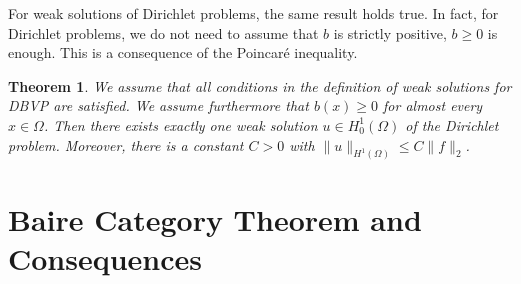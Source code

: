 \documentclass[11pt,a4paper]{article}
\newtheorem{thm}{Theorem}[section]
\theoremstyle{definition}
\begin{document}
\noindent For weak solutions of Dirichlet problems, the same result holds true. In fact, for Dirichlet problems, we do not need to assume that $b$ is strictly positive, $b \geq 0$ is enough. This is a consequence of the Poincaré inequality. 
\begin{thm} We assume that all conditions in the definition of weak solutions for DBVP are satisfied. We assume furthermore that $b(x) \geq 0$ for almost every $x \in \Omega$. Then there exists exactly one weak solution $u \in H_0^1( \Omega)$ of the Dirichlet problem. Moreover, there is a constant $C>0$ with $\|u \|_{H^1( \Omega)} \leq C\|f\|_2$.
\end{thm}
\newpage 
\section{Baire Category Theorem and Consequences}
\end{document}
